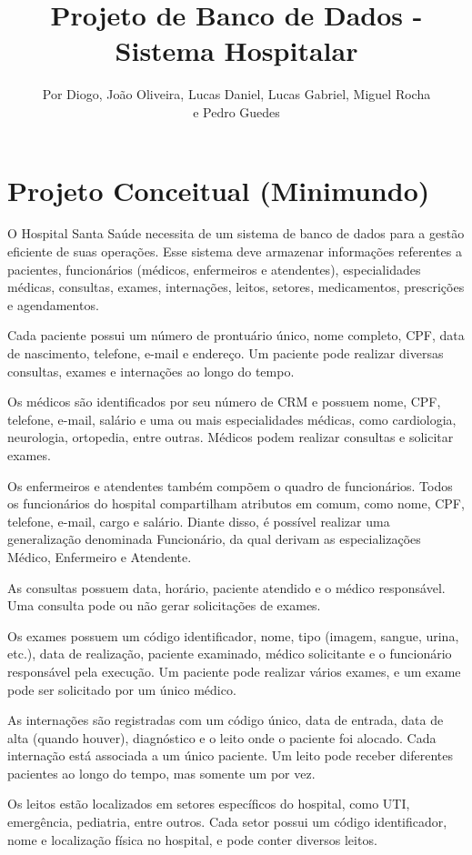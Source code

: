 \documentclass[a4paper,12pt]{article}
\title{Projeto de Banco de Dados - Sistema Hospitalar}
\author{Por Diogo, João Oliveira, Lucas Daniel, Lucas Gabriel, Miguel Rocha \\ e Pedro Guedes}
\date{}
\begin{document}
\maketitle

\section*{Projeto Conceitual (Minimundo)}

O Hospital Santa Saúde necessita de um sistema de banco de dados para a gestão eficiente de suas operações. Esse sistema deve armazenar informações referentes a pacientes, funcionários (médicos, enfermeiros e atendentes), especialidades médicas, consultas, exames, internações, leitos, setores, medicamentos, prescrições e agendamentos.

Cada paciente possui um número de prontuário único, nome completo, CPF, data de nascimento, telefone, e-mail e endereço. Um paciente pode realizar diversas consultas, exames e internações ao longo do tempo.

Os médicos são identificados por seu número de CRM e possuem nome, CPF, telefone, e-mail, salário e uma ou mais especialidades médicas, como cardiologia, neurologia, ortopedia, entre outras. Médicos podem realizar consultas e solicitar exames.

Os enfermeiros e atendentes também compõem o quadro de funcionários. Todos os funcionários do hospital compartilham atributos em comum, como nome, CPF, telefone, e-mail, cargo e salário. Diante disso, é possível realizar uma generalização denominada Funcionário, da qual derivam as especializações Médico, Enfermeiro e Atendente.

As consultas possuem data, horário, paciente atendido e o médico responsável. Uma consulta pode ou não gerar solicitações de exames.

Os exames possuem um código identificador, nome, tipo (imagem, sangue, urina, etc.), data de realização, paciente examinado, médico solicitante e o funcionário responsável pela execução. Um paciente pode realizar vários exames, e um exame pode ser solicitado por um único médico.

As internações são registradas com um código único, data de entrada, data de alta (quando houver), diagnóstico e o leito onde o paciente foi alocado. Cada internação está associada a um único paciente. Um leito pode receber diferentes pacientes ao longo do tempo, mas somente um por vez.

Os leitos estão localizados em setores específicos do hospital, como UTI, emergência, pediatria, entre outros. Cada setor possui um código identificador, nome e localização física no hospital, e pode conter diversos leitos.
\end{document}
